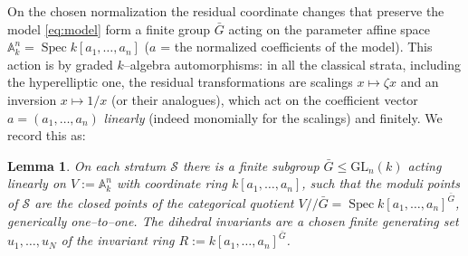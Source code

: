 \documentclass{amsart}
\newtheorem{lemma}[theorem]{Lemma}
\theoremstyle{definition}
\DeclareMathOperator{\Spec}{Spec}
\begin{document}
On the chosen normalization the residual coordinate changes that preserve the
model \eqref{eq:model} form a finite group $\bar G$ acting on the parameter affine
space $\mathbb{A}^n_k=\Spec k[a_1,\dots,a_n]$ ($a$ = the normalized coefficients of
the model). This action is by graded $k$--algebra automorphisms: in all the
classical strata, including the hyperelliptic one, the residual transformations
are scalings $x\mapsto \zeta x$ and an inversion $x\mapsto 1/x$ (or their
analogues), which act on the coefficient vector $a=(a_1,\dots,a_n)$ \emph{linearly}
(indeed monomially for the scalings) and finitely. We record this as:

\begin{lemma}\label{lem:linear}
On each stratum $\mathcal S$ there is a finite subgroup
$\bar G\le \mathrm{GL}_n(k)$ acting linearly on $V:=\mathbb{A}^n_k$ with
coordinate ring $k[a_1,\dots,a_n]$, such that the moduli points of $\mathcal S$ are
the closed points of the categorical quotient $V/\!\!/\bar G=\Spec
k[a_1,\dots,a_n]^{\bar G}$, generically one--to--one. The dihedral invariants are
a chosen finite generating set $u_1,\dots,u_N$ of the invariant ring
$R:=k[a_1,\dots,a_n]^{\bar G}$.
\end{lemma}
\end{document}

